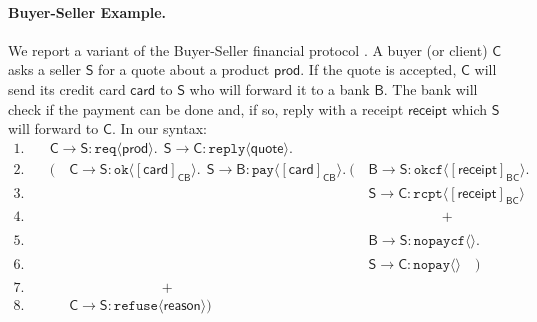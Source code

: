 \documentclass[copyright]{eptcs}
\newcommand{\msgbox}[2]{[#1]_{#2}}
\newcommand{\interact}[4]{#1\rightarrow#2:\mathsf{#3}\langle#4\rangle}
\newcommand{\pfx}{\mathbf.\ }
\begin{document}
\paragraph{Buyer-Seller Example.}
We report a variant of the Buyer-Seller financial protocol
\cite{carbone.honda.yoshida:esop07}. A buyer (or client) $\mathsf{C}$
asks a seller $\mathsf{S}$ for a quote about a product
$\mathsf{prod}$. If the quote is accepted, $\mathsf{C}$ will send its
credit card $\mathsf{card}$ to $\mathsf{S}$ who will forward it to a
bank $\mathsf{B}$. The
bank will check if the payment can be done and, if so, reply with a receipt
$\mathsf{receipt}$ which $\mathsf S$ will forward to $\mathsf{C}$.  In
our syntax:
\begin{align*}
  1.\quad &
  \interact{\mathsf{C}}{\mathsf{S}}{\texttt{req}}{\mathsf{prod}}\pfx\
  \interact{\mathsf{S}}{\mathsf{C}}{\texttt{reply}}{\mathsf{quote}}\pfx\\
  2.\quad & (\quad\interact{\mathsf{C}}{\mathsf{S}}{\texttt{ok}}
  {\msgbox{\mathsf{card}}{\mathsf{C}\mathsf{B}}}\pfx\
  \interact{\mathsf{S}}{\mathsf{B}}{\texttt{pay}}
  {\msgbox{\mathsf{card}}{\mathsf{C}\mathsf{B}}}\pfx
  (\quad\interact{\mathsf{B}}{\mathsf{S}}{\texttt{okcf}}
  {\msgbox{\mathsf{receipt}}{\mathsf{B}\mathsf{C}}}\pfx\\
  3.\quad & 
  \phantom{
    (\quad\interact{\mathsf{C}}{\mathsf{S}}{\texttt{ok}}
    {\msgbox{\mathsf{card}}{\mathsf{C}\mathsf{B}}}\pfx\
    \interact{\mathsf{S}}{\mathsf{B}}{\texttt{pay}}
    {\msgbox{\mathsf{card}}{\mathsf{C}\mathsf{B}}}\pfx
    (\quad
  }
  \interact{\mathsf{S}}{\mathsf{C}}{\texttt{rcpt}}
  {\msgbox{\mathsf{receipt}}{\mathsf{B}\mathsf{C}}}\\
  4.\quad & 
  \phantom{
    (\quad\interact{\mathsf{C}}{\mathsf{S}}{\texttt{ok}}
    {\msgbox{\mathsf{card}}{\mathsf{C}\mathsf{B}}}\pfx\
    \interact{\mathsf{S}}{\mathsf{B}}{\texttt{pay}}
    {\msgbox{\mathsf{card}}{\mathsf{C}\mathsf{B}}}\pfx
    (\quad
  }
  \quad\qquad\qquad+\\
  5.\quad & 
  \phantom{
    (\quad\interact{\mathsf{C}}{\mathsf{S}}{\texttt{ok}}
    {\msgbox{\mathsf{card}}{\mathsf{C}\mathsf{B}}}\pfx\
    \interact{\mathsf{S}}{\mathsf{B}}{\texttt{pay}}
    {\msgbox{\mathsf{card}}{\mathsf{C}\mathsf{B}}}\pfx
    (\quad
  }
  \interact{\mathsf{B}}{\mathsf{S}}{\texttt{nopaycf}}{}\pfx\\
  6.\quad & 
  \phantom{
    (\quad\interact{\mathsf{C}}{\mathsf{S}}{\texttt{ok}}
    {\msgbox{\mathsf{card}}{\mathsf{C}\mathsf{B}}}\pfx\
    \interact{\mathsf{S}}{\mathsf{B}}{\texttt{pay}}
    {\msgbox{\mathsf{card}}{\mathsf{C}\mathsf{B}}}\pfx
    (\quad
  }
  \interact{\mathsf{S}}{\mathsf{C}}{\texttt{nopay}}{}\quad)\\
  7.\quad & \qquad\qquad\qquad\qquad+\\
  8.\quad & \phantom{(\quad}
  \interact{\mathsf{C}}{\mathsf{S}}{\texttt{refuse}}{\mathsf{reason}})
\end{align*} 
\end{document}

